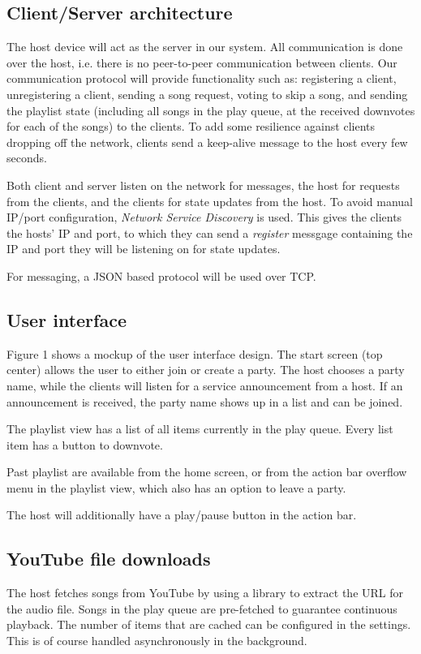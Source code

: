\documentclass{report}
\begin{document}
\subsection{Client/Server architecture}
The host device will act as the server in our system. All communication is
done over the host, i.e. there is no peer-to-peer communication between
clients. Our communication protocol will provide functionality such as:
registering a client, unregistering a client, sending a song request,
voting to skip a song, and sending the playlist state (including all songs
in the play queue, at the received downvotes for each of the songs) to the clients.
To add some resilience against clients dropping off the network,
clients send a keep-alive message to the host every few seconds.

Both client and server listen on the network for messages,
the host for requests from the clients, and the clients for state updates
from the host. To avoid manual IP/port configuration, \emph{Network Service Discovery}
\cite{nsd} is used. This gives the clients the hosts' IP and port,
to which they can send a \emph{register} messgage containing the IP and port they
will be listening on for state updates.

For messaging, a JSON based protocol will be used over TCP.

\subsection{User interface}
Figure 1 shows a mockup of the user interface design. The start screen
(top center) allows the user to either join or create a party. The host chooses
a party name, while the clients will listen for a service announcement
from a host. If an announcement is received, the party name shows up
in a list and can be joined.

The playlist view has a list of all items currently in the play queue.
Every list item has a button to downvote.

Past playlist are available from the home screen, or from the action bar
overflow menu in the playlist view, which also has an option to leave a party.

The host will additionally have a play/pause button in the action bar.

\subsection{YouTube file downloads}
The host fetches songs from YouTube by using a library \cite{youtubeExtractor}
to extract the URL for the audio file. Songs in the play queue are pre-fetched
to guarantee continuous playback. The number of items that are cached can be
configured in the settings. This is of course handled asynchronously in
the background.
\end{document}
